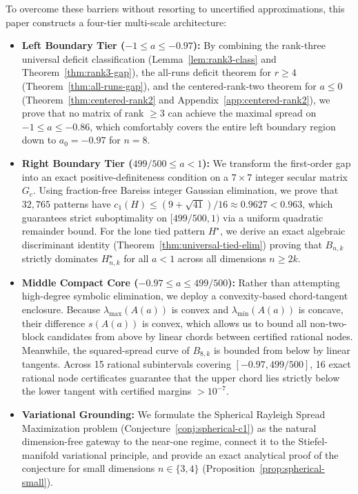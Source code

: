 \documentclass[11pt,reqno]{article}
\theoremstyle{definition}
\begin{document}
To overcome these barriers without resorting to uncertified approximations, this paper constructs a four-tier multi-scale architecture:
\begin{itemize}
    \item \textbf{Left Boundary Tier ($-1 \le a \le -0.97$):} By combining the rank-three universal deficit classification (Lemma~\ref{lem:rank3-class} and Theorem~\ref{thm:rank3-gap}), the all-runs deficit theorem for $r \ge 4$ (Theorem~\ref{thm:all-runs-gap}), and the centered-rank-two theorem for $a \le 0$ (Theorem~\ref{thm:centered-rank2} and Appendix~\ref{app:centered-rank2}), we prove that no matrix of rank $\ge 3$ can achieve the maximal spread on $-1 \le a \le -0.86$, which comfortably covers the entire left boundary region down to $a_0 = -0.97$ for $n=8$.
    \item \textbf{Right Boundary Tier ($499/500 \le a < 1$):} We transform the first-order gap into an exact positive-definiteness condition on a $7 \times 7$ integer secular matrix $G_c$. Using fraction-free Bareiss integer Gaussian elimination, we prove that $32{,}765$ patterns have $c_1(H) \le (9+\sqrt{41})/16 \approx 0.9627 < 0.963$, which guarantees strict suboptimality on $[499/500, 1)$ via a uniform quadratic remainder bound. For the lone tied pattern $H^\star$, we derive an exact algebraic discriminant identity (Theorem~\ref{thm:universal-tied-elim}) proving that $B_{n, k}$ strictly dominates $H^\star_{n, k}$ for all $a < 1$ across all dimensions $n \ge 2k$.
    \item \textbf{Middle Compact Core ($-0.97 \le a \le 499/500$):} Rather than attempting high-degree symbolic elimination, we deploy a convexity-based chord-tangent enclosure. Because $\lambda_{\max}(A(a))$ is convex and $\lambda_{\min}(A(a))$ is concave, their difference $s(A(a))$ is convex, which allows us to bound all non-two-block candidates from above by linear chords between certified rational nodes. Meanwhile, the squared-spread curve of $B_{8, k}$ is bounded from below by linear tangents. Across 15 rational subintervals covering $[-0.97, 499/500]$, 16 exact rational node certificates guarantee that the upper chord lies strictly below the lower tangent with certified margins $> 10^{-7}$.
    \item \textbf{Variational Grounding:} We formulate the Spherical Rayleigh Spread Maximization problem (Conjecture~\ref{conj:spherical-c1}) as the natural dimension-free gateway to the near-one regime, connect it to the Stiefel-manifold variational principle, and provide an exact analytical proof of the conjecture for small dimensions $n \in \{3, 4\}$ (Proposition~\ref{prop:spherical-small}).
\end{itemize}
\end{document}
